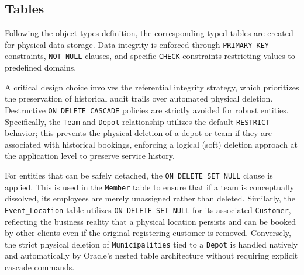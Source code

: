 \documentclass[12pt]{article}
\begin{document}
\subsection{Tables}

Following the object types definition, the corresponding typed tables are created for physical data storage. Data integrity is enforced through \texttt{PRIMARY KEY} constraints, \texttt{NOT NULL} clauses, and specific \texttt{CHECK} constraints restricting values to predefined domains. 

A critical design choice involves the referential integrity strategy, which prioritizes the preservation of historical audit trails over automated physical deletion. Destructive \texttt{ON DELETE CASCADE} policies are strictly avoided for robust entities. Specifically, the \texttt{Team} and \texttt{Depot} relationship utilizes the default \texttt{RESTRICT} behavior; this prevents the physical deletion of a depot or team if they are associated with historical bookings, enforcing a logical (soft) deletion approach at the application level to preserve service history. 

For entities that can be safely detached, the \texttt{ON DELETE SET NULL} clause is applied. This is used in the \texttt{Member} table to ensure that if a team is conceptually dissolved, its employees are merely unassigned rather than deleted. Similarly, the \texttt{Event\_Location} table utilizes \texttt{ON DELETE SET NULL} for its associated \texttt{Customer}, reflecting the business reality that a physical location persists and can be booked by other clients even if the original registering customer is removed. Conversely, the strict physical deletion of \texttt{Municipalities} tied to a \texttt{Depot} is handled natively and automatically by Oracle's nested table architecture without requiring explicit cascade commands.
\end{document}
